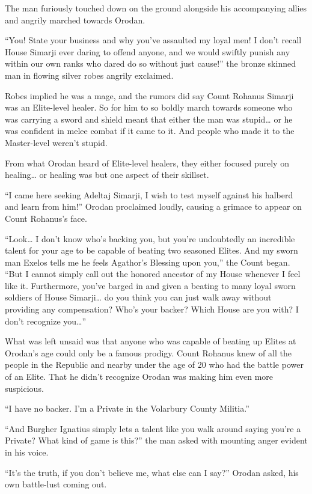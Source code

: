 \documentclass[a4paper,10pt]{book}
\begin{document}
The man furiously touched down on the ground alongside his accompanying allies and angrily marched towards Orodan.\par
“You! State your business and why you’ve assaulted my loyal men! I don’t recall House Simarji ever daring to offend anyone, and we would swiftly punish any within our own ranks who dared do so without just cause!” the bronze skinned man in flowing silver robes angrily exclaimed.\par
Robes implied he was a mage, and the rumors did say Count Rohanus Simarji was an Elite-level healer. So for him to so boldly march towards someone who was carrying a sword and shield meant that either the man was stupid… or he was confident in melee combat if it came to it. And people who made it to the Master-level weren't stupid.\par
From what Orodan heard of Elite-level healers, they either focused purely on healing… or healing was but one aspect of their skillset.\par
“I came here seeking Adeltaj Simarji, I wish to test myself against his halberd and learn from him!” Orodan proclaimed loudly, causing a grimace to appear on Count Rohanus’s face.\par
“Look… I don’t know who’s backing you, but you’re undoubtedly an incredible talent for your age to be capable of beating two seasoned Elites. And my sworn man Exelos tells me he feels Agathor’s Blessing upon you,” the Count began. “But I cannot simply call out the honored ancestor of my House whenever I feel like it. Furthermore, you’ve barged in and given a beating to many loyal sworn soldiers of House Simarji… do you think you can just walk away without providing any compensation? Who’s your backer? Which House are you with? I don’t recognize you…”\par
What was left unsaid was that anyone who was capable of beating up Elites at Orodan’s age could only be a famous prodigy. Count Rohanus knew of all the people in the Republic and nearby under the age of 20 who had the battle power of an Elite. That he didn’t recognize Orodan was making him even more suspicious.\par
“I have no backer. I’m a Private in the Volarbury County Militia.”\par
“And Burgher Ignatius simply lets a talent like you walk around saying you’re a Private? What kind of game is this?” the man asked with mounting anger evident in his voice.\par
“It’s the truth, if you don’t believe me, what else can I say?” Orodan asked, his own battle-lust coming out.\par
\end{document}
